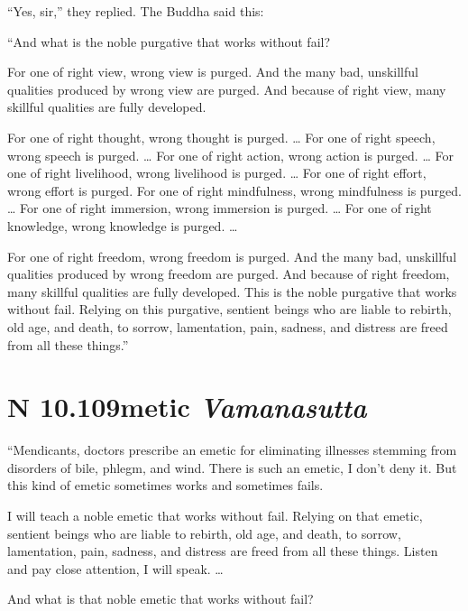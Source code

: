 \documentclass[12pt,openany]{book}%
\newcommand*{\suttatitleacronym}[1]{\smaller[2]{#1}\vspace*{.3em}}
\newcommand*{\suttatitletranslation}[1]{\linebreak{#1}}
\newcommand*{\suttatitleroot}[1]{\linebreak\smaller[2]\itshape{#1}}
\newcommand*{\tocacronym}[1]{\hspace*{-3.3em}{#1}\quad}
\newcommand*{\toctranslation}[1]{#1}
\newcommand*{\tocroot}[1]{(\textit{#1})}
\begin{document}
“Yes, sir,” they replied. The Buddha said this: 

“And what is the noble purgative that works without fail? 

For one of right view, wrong view is purged. And the many bad, unskillful qualities produced by wrong view are purged. And because of right view, many skillful qualities are fully developed. 

For one of right thought, wrong thought is purged. … For one of right speech, wrong speech is purged. … For one of right action, wrong action is purged. … For one of right livelihood, wrong livelihood is purged. … For one of right effort, wrong effort is purged. For one of right mindfulness, wrong mindfulness is purged. … For one of right immersion, wrong immersion is purged. … For one of right knowledge, wrong knowledge is purged. … 

For one of right freedom, wrong freedom is purged. And the many bad, unskillful qualities produced by wrong freedom are purged. And because of right freedom, many skillful qualities are fully developed. This is the noble purgative that works without fail. Relying on this purgative, sentient beings who are liable to rebirth, old age, and death, to sorrow, lamentation, pain, sadness, and distress are freed from all these things.” 

%
\section*{{\suttatitleacronym AN 10.109}{\suttatitletranslation Emetic }{\suttatitleroot Vamanasutta}}
\addcontentsline{toc}{section}{\tocacronym{AN 10.109} \toctranslation{Emetic } \tocroot{Vamanasutta}}

“Mendicants, doctors prescribe an emetic for eliminating illnesses stemming from disorders of bile, phlegm, and wind. There is such an emetic, I don’t deny it. But this kind of emetic sometimes works and sometimes fails. 

I will teach a noble emetic that works without fail. Relying on that emetic, sentient beings who are liable to rebirth, old age, and death, to sorrow, lamentation, pain, sadness, and distress are freed from all these things. Listen and pay close attention, I will speak. … 

And what is that noble emetic that works without fail? 
\end{document}
